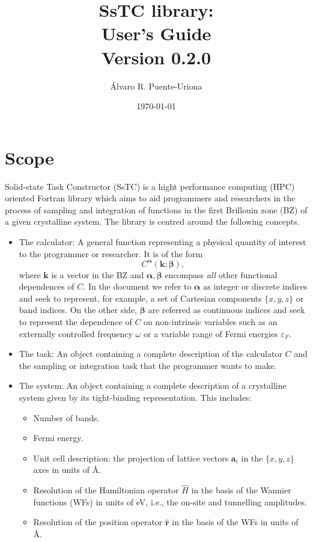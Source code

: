 \documentclass[10pt,a4paper]{article}
\title{SsTC library:\\
\large{User's Guide}\\
\large{Version 0.2.0}}
\author{Álvaro R. Puente-Uriona}
\date{\today}
\begin{document}
\maketitle
\tableofcontents
\section{Scope}
Solid-state Task Constructor (SsTC) is a hight performance computing (HPC) oriented Fortran library which aims to aid programmers and researchers in the process of sampling and integration of functions in the first Brillouin zone (BZ) of a given crystalline system. The library is centred around the following concepts.
\begin{itemize}
\item The calculator: A general function representing a physical quantity of interest to the programmer or researcher. It is of the form
\begin{equation}\label{eq:calculator}
C^{\bm{\alpha}}(\bm{k}; \bm{\beta}),
\end{equation}
where $\bm{k}$ is a vector in the BZ and $\bm{\alpha}, \bm{\beta}$ encompass \textit{all} other functional dependences of $C$. In the document we refer to $\bm{\alpha}$ as integer or discrete indices and seek to represent, for example, a set of Cartesian components $\{x, y, z\}$ or band indices. On the other side, $\bm{\beta}$ are referred as continuous indices and seek to represent the dependence of $C$ on non-intrinsic variables such as an externally controlled frequency $\omega$ or a variable range of Fermi energies $\varepsilon_F$.
\item The task: An object containing a complete description of the calculator $C$ and the sampling or integration task that the programmer wants to make.
\item The system: An object containing a complete description of a crystalline system given by its tight-binding \cite{marzariMaximallyLocalizedWannier2012} representation. This includes:
\begin{itemize}
\item Number of bands.
\item Fermi energy.
\item Unit cell description: the projection of lattice vectors $\bm{a}_i$ in the $\{x, y, z\}$ axes in units of \r{A}.
\item Resolution of the Hamiltonian operator $\hat{H}$ in the basis of the Wannier functions (WFs) \cite{marzariMaximallyLocalizedWannier2012} in units of eV, i.e., the on-site and tunnelling amplitudes.
\item Resolution of the position operator $\hat{\bm{r}}$ in the basis of the WFs in units of \r{A}.
\end{itemize}
\end{itemize}
\end{document}
